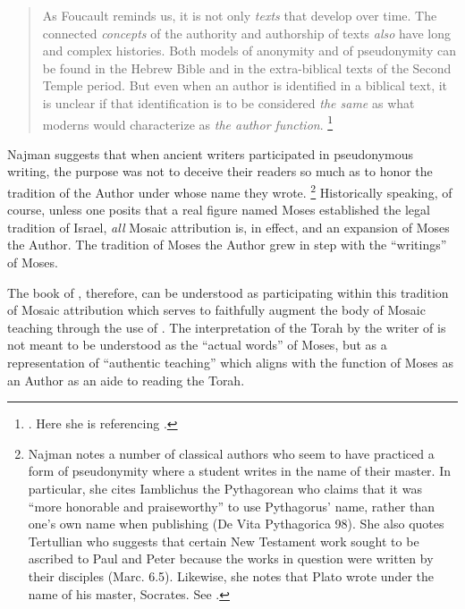 \begin{quote}
    As Foucault reminds us, it is not only \emph{texts} that develop over time. The connected \emph{concepts} of the authority and authorship of texts \emph{also} have long and complex histories. Both models of anonymity and of pseudonymity can be found in the Hebrew Bible and in the extra-biblical texts of the Second Temple period. But even when an author is identified in a biblical text, it is unclear if that identification is to be considered \emph{the same} as what moderns would characterize as \emph{the author function}.%
        \footnote{%
            \cite[9--10]{najman2003}. Here she is referencing
            \cite[213]{foucault_essential-foucault_2}.}
\end{quote}
\noindent
Najman suggests that when ancient writers participated in pseudonymous writing, the purpose was not to deceive their readers so much as to honor the tradition of the Author under whose name they wrote.%
    \footnote{Najman notes a number of classical authors who seem to have practiced a form of pseudonymity where a student writes in the name of their master. In particular, she cites Iamblichus the Pythagorean who claims that it was ``more honorable and praiseworthy'' to use Pythagorus' name, rather than one's own name when publishing (De Vita Pythagorica 98). She also quotes Tertullian who suggests that certain New Testament work sought to be ascribed to Paul and Peter because the works in question were written by their disciples (Marc. 6.5). Likewise, she notes that Plato wrote under the name of his master, Socrates. See \cite[13]{najman2003}.}
Historically speaking, of course, unless one posits that a real figure named Moses established the legal tradition of Israel, \emph{all} Mosaic attribution is, in effect, \psgraphical and an expansion of Moses the Author. The tradition of Moses the Author grew in step with the ``writings'' of Moses.

The book of \jub, therefore, can be understood as participating within this tradition of Mosaic attribution which serves to faithfully augment the body of Mosaic teaching through the use of \psy. The interpretation of the Torah by the writer of \jub is not meant to be understood as the ``actual words'' of Moses, but as a representation of ``authentic teaching'' which aligns with the function of Moses as an Author as an aide to reading the Torah.\autocite[13]{najman2003}

